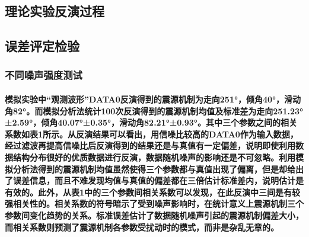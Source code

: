 \documentclass[a4paper,12pt,single,pdftex]{scrartcl}
\begin{document}
\label{ID_1720353574}\subsection{理论实验反演过程}

\label{ID_1894488209}\subsubsection{}

\label{ID_1185467957}\subsubsection{}

\label{ID_146378205}\subsection{误差评定检验}

\label{ID_1408987114}\subsubsection{不同噪声强度测试}

\label{ID_118132279}\paragraph{模拟实验中“观测波形”DATA0反演得到的震源机制为走向251°，倾角40°，滑动角82°。而模拟分析法统计100次反演得到的震源机制均值及标准差为走向251.23°±2.59°，倾角40.07°±0.35°，滑动角82.21°±0.93°。其中三个参数之间的相关系数如表1所示。从反演结果可以看出，用信噪比较高的DATA0作为输入数据，经过滤波再提高信噪比后反演得到的结果还是与真值有一定偏差，说明即使利用数据结构分布很好的优质数据进行反演，数据随机噪声的影响还是不可忽略。利用模拟分析法得到的震源机制均值虽然使得三个参数都与真值出现了偏离，但是却给出了误差信息，而且不难发现均值与真值的偏差都在三倍估计标准差内，说明估计是有效的。此外，从表1中的三个参数间相关系数可以发现，在此反演中三间是有较强相关性的。相关系数的符号暗示了受到噪声影响时，在统计意义上震源机制三个参数间变化趋势的关系。标准误差估计了数据随机噪声引起的震源机制偏差大小，而相关系数则预测了震源机制各参数受扰动时的模式，而非是杂乱无章的。}

\label{ID_828329485}\paragraph{}

\label{ID_849692593}\paragraph{}
\end{document}
